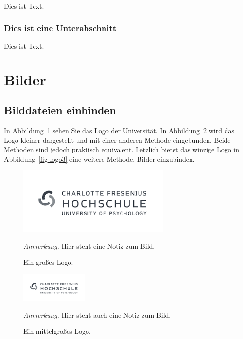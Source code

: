 \documentclass[
  stu,
  floatsintext,
  longtable,
  a4paper,
  nolmodern,
  notxfonts,
  notimes,
  donotrepeattitle,
  colorlinks=true,linkcolor=blue,citecolor=blue,urlcolor=blue]{apa7}
\begin{document}
Dies ist Text.

\subsubsection{Dies ist eine
Unterabschnitt}\label{dies-ist-eine-unterabschnitt}

Dies ist Text.

\section{Bilder}\label{bilder}

\subsection{Bilddateien einbinden}\label{sec-bildladen}

In Abbildung~\ref{fig-logo} sehen Sie das Logo der Universität. In
Abbildung~\ref{fig-logo2} wird das Logo kleiner dargestellt und mit
einer anderen Methode eingebunden. Beide Methoden sind jedoch praktisch
equivalent. Letzlich bietet das winzige Logo in
Abbildung~\ref{fig-logo3} eine weitere Methode, Bilder einzubinden.

\begin{figure}[t]

{\caption{{Ein großes Logo.}{\label{fig-logo}}}}

\includegraphics[width=3in,height=\textheight]{logo.png}

{\noindent \emph{Anmerkung.} Hier steht eine Notiz zum Bild.}

\end{figure}

\begin{figure}[t]

\caption{\label{fig-logo2}Ein mittelgroßes Logo.}

\includegraphics[width=0.3\textwidth,height=\textheight]{logo.png}

\emph{Anmerkung.} Hier steht auch eine Notiz zum Bild.

\end{figure}%
\end{document}
